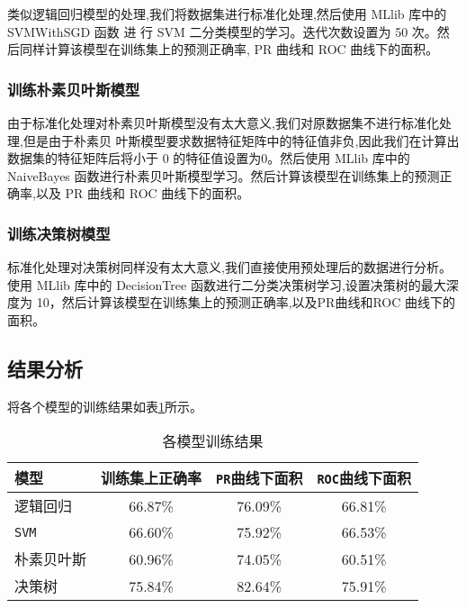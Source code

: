 类似逻辑回归模型的处理,我们将数据集进行标准化处理,然后使用 MLlib 库中的
SVMWithSGD 函数 进 行 SVM 二分类模型的学习。迭代次数设置为 50
次。然后同样计算该模型在训练集上的预测正确率, PR 曲线和 ROC
曲线下的面积。

\subsubsection{训练朴素贝叶斯模型}\label{ux8badux7ec3ux6734ux7d20ux8d1dux53f6ux65afux6a21ux578b}

由于标准化处理对朴素贝叶斯模型没有太大意义,我们对原数据集不进行标准化处理,但是由于朴素贝
叶斯模型要求数据特征矩阵中的特征值非负,因此我们在计算出数据集的特征矩阵后将小于
0 的特征值设置为0。然后使用 MLlib 库中的 NaiveBayes
函数进行朴素贝叶斯模型学习。然后计算该模型在训练集上的预测正确率,以及
PR 曲线和 ROC 曲线下的面积。

\subsubsection{训练决策树模型}\label{ux8badux7ec3ux51b3ux7b56ux6811ux6a21ux578b}

标准化处理对决策树同样没有太大意义,我们直接使用预处理后的数据进行分析。使用
MLlib 库中的 DecisionTree
函数进行二分类决策树学习,设置决策树的最大深度为
10，然后计算该模型在训练集上的预测正确率,以及PR曲线和ROC
曲线下的面积。

\subsection{结果分析}\label{ux7ed3ux679cux5206ux6790}

将各个模型的训练结果如表\ref{model-outcome}所示。

\begin{table}[!hbp]
	\centering
	\caption{各模型训练结果}
	\label{model-outcome}
	\begin{tabular}{lccc}
		\toprule
模型 &训练集上正确率 &\texttt{PR}曲线下面积 &\texttt{ROC}曲线下面积\\
\midrule
逻辑回归 & 66.87\% & 76.09\% &66.81\%\\
\texttt{SVM} &66.60\% &75.92\% & 66.53\%\\
朴素贝叶斯 &60.96\% & 74.05\% &60.51\%\\
决策树 &75.84\% &82.64\% & 75.91\%\\
\bottomrule
\end{tabular}
\end{table}



